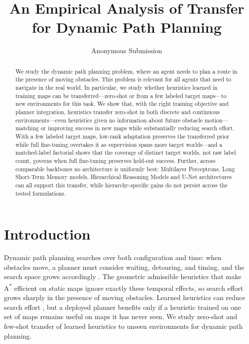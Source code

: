 \documentclass[letterpaper]{article} %
\title{An Empirical Analysis of Transfer for Dynamic Path Planning}
\author{
    Anonymous Submission
}
\begin{document}
\maketitle

\begin{abstract}
We study the dynamic path planning problem, where an agent needs to plan a route in the presence of moving obstacles. This problem is relevant for all agents that need to navigate in the real world. In particular, we study whether heuristics learned in training maps can be transferred---zero-shot or from a few labeled target maps---to new environments for this task. We show that, with the right training objective and planner integration, heuristics transfer zero-shot in both discrete and continuous environments---even heuristics given no information about future obstacle motion---matching or improving success in new maps while substantially reducing search effort. With a few labeled target maps, low-rank adaptation preserves the transferred prior while full fine-tuning overtakes it as supervision spans more target worlds---and a matched-label factorial shows that the coverage of distinct target worlds, not raw label count, governs when full fine-tuning preserves held-out success. Further, across comparable backbones no architecture is uniformly best: Multilayer Perceptrons, Long Short-Term Memory models, Hierarchical Reasoning Models and U-Net architectures can all support this transfer, while hierarchy-specific gains do not persist across the tested formulations.
\end{abstract}


\section{Introduction}

Dynamic path planning searches over both configuration and time: when obstacles move, a planner must consider waiting, detouring, and timing, and the search space grows accordingly \citep{silver2005cooperative,phillips2011sipp}. The geometric admissible heuristics that make A\textsuperscript{*} \citep{hart1968astar} efficient on static maps ignore exactly these temporal effects, so search effort grows sharply in the presence of moving obstacles. Learned heuristics can reduce search effort \citep{arfaee2011bootstrap,bhardwaj2017sail,yonetani2021neuralastar}, but a deployed planner benefits only if a heuristic trained on one set of maps remains useful on maps it has never seen. We study zero-shot and few-shot transfer of learned heuristics to unseen environments for dynamic path planning.
\end{document}

